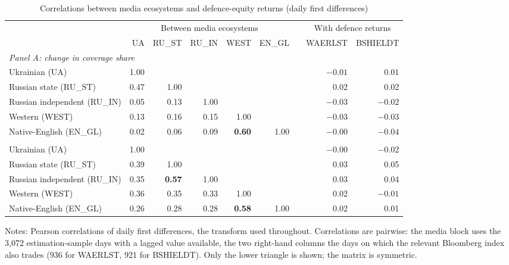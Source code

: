 \documentclass[12pt,a4paper]{article}
\newcommand{\compactx}{\setlength{\tabcolsep}{3pt}\footnotesize}
\begin{document}
\begin{table}[htbp]
\centering
\caption{Correlations between media ecosystems and defence-equity returns (daily first differences)}
\label{tab:correlations}
\begin{threeparttable}
\compactx
\begin{tabular}{lrrrrrcrr}
\toprule
 & \multicolumn{5}{c}{Between media ecosystems} & & \multicolumn{2}{c}{With defence returns} \\
\cmidrule(lr){2-6}\cmidrule(lr){8-9}
 & UA & RU\_ST & RU\_IN & WEST & EN\_GL & & WAERLST & BSHIELDT \\
\midrule
\multicolumn{9}{l}{\textit{Panel A: change in coverage share}} \\
Ukrainian (UA) & 1.00 & & & & & & $-0.01$ & 0.01 \\
Russian state (RU\_ST) & 0.47 & 1.00 & & & & & 0.02 & 0.02 \\
Russian independent (RU\_IN) & 0.05 & 0.13 & 1.00 & & & & $-0.03$ & $-0.02$ \\
Western (WEST) & 0.13 & 0.16 & 0.15 & 1.00 & & & $-0.03$ & $-0.03$ \\
Native-English (EN\_GL) & 0.02 & 0.06 & 0.09 & \textbf{0.60} & 1.00 & & $-0.00$ & $-0.04$ \\
\addlinespace
\multicolumn{9}{l}{\textit{Panel B: change in coverage tone}} \\
Ukrainian (UA) & 1.00 & & & & & & $-0.00$ & $-0.02$ \\
Russian state (RU\_ST) & 0.39 & 1.00 & & & & & 0.03 & 0.05 \\
Russian independent (RU\_IN) & 0.35 & \textbf{0.57} & 1.00 & & & & 0.03 & 0.04 \\
Western (WEST) & 0.36 & 0.35 & 0.33 & 1.00 & & & 0.02 & $-0.01$ \\
Native-English (EN\_GL) & 0.26 & 0.28 & 0.28 & \textbf{0.58} & 1.00 & & 0.02 & 0.01 \\
\bottomrule
\end{tabular}
\begin{tablenotes}
\footnotesize
\item Notes: Pearson correlations of daily first differences, the transform used
throughout. Correlations are pairwise: the media block uses the 3,072
estimation-sample days with a lagged value available, the two right-hand columns
the days on which the relevant Bloomberg index also trades (936 for WAERLST, 921
for BSHIELDT). Only the lower triangle is shown; the matrix is symmetric.
\end{tablenotes}
\end{threeparttable}
\end{table}
\end{document}
